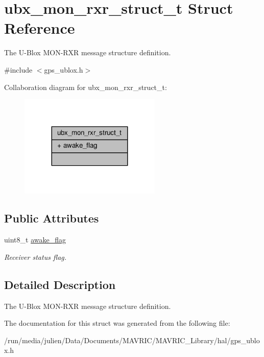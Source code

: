 \hypertarget{structubx__mon__rxr__struct__t}{\section{ubx\+\_\+mon\+\_\+rxr\+\_\+struct\+\_\+t Struct Reference}
\label{structubx__mon__rxr__struct__t}
}


The U-\/\+Blox M\+O\+N-\/\+R\+X\+R message structure definition.  




{\ttfamily \#include $<$gps\+\_\+ublox.\+h$>$}



Collaboration diagram for ubx\+\_\+mon\+\_\+rxr\+\_\+struct\+\_\+t\+:
\nopagebreak
\begin{figure}[H]
\begin{center}
\leavevmode
\includegraphics[width=191pt]{structubx__mon__rxr__struct__t__coll__graph}
\end{center}
\end{figure}
\subsection*{Public Attributes}
\begin{DoxyCompactItemize}
\item 
\hypertarget{structubx__mon__rxr__struct__t_a4e6424c43ded99ae1d21978725f0f26d}{uint8\+\_\+t \hyperlink{structubx__mon__rxr__struct__t_a4e6424c43ded99ae1d21978725f0f26d}{awake\+\_\+flag}}\label{structubx__mon__rxr__struct__t_a4e6424c43ded99ae1d21978725f0f26d}

\begin{DoxyCompactList}\small\item\em Receiver status flag. \end{DoxyCompactList}\end{DoxyCompactItemize}


\subsection{Detailed Description}
The U-\/\+Blox M\+O\+N-\/\+R\+X\+R message structure definition. 

The documentation for this struct was generated from the following file\+:\begin{DoxyCompactItemize}
\item 
/run/media/julien/\+Data/\+Documents/\+M\+A\+V\+R\+I\+C/\+M\+A\+V\+R\+I\+C\+\_\+\+Library/hal/gps\+\_\+ublox.\+h\end{DoxyCompactItemize}
